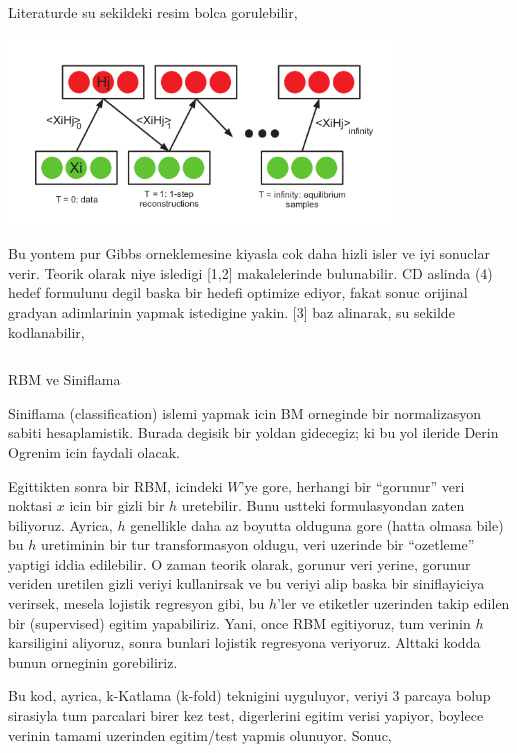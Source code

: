 \documentclass[12pt,fleqn]{article}\usepackage{../common}
\begin{document}
Literaturde su sekildeki resim bolca gorulebilir,

\includegraphics[height=5cm]{rbm_03.png}

Bu yontem pur Gibbs orneklemesine kiyasla cok daha hizli isler ve iyi
sonuclar verir. Teorik olarak niye isledigi [1,2] makalelerinde
bulunabilir. CD aslinda (4) hedef formulunu degil baska bir hedefi optimize
ediyor, fakat sonuc orijinal gradyan adimlarinin yapmak istedigine
yakin. [3] baz alinarak, su sekilde kodlanabilir,

\inputminted[fontsize=\footnotesize]{python}{rbm.py}

RBM ve Siniflama 

Siniflama (classification) islemi yapmak icin BM orneginde bir
normalizasyon sabiti hesaplamistik. Burada degisik bir yoldan gidecegiz; ki
bu yol ileride Derin Ogrenim icin faydali olacak. 

Egittikten sonra bir RBM, icindeki $W$'ye gore, herhangi bir ``gorunur''
veri noktasi $x$ icin bir gizli bir $h$ uretebilir. Bunu ustteki
formulasyondan zaten biliyoruz. Ayrica, $h$ genellikle daha az boyutta
olduguna gore (hatta olmasa bile) bu $h$ uretiminin bir tur transformasyon
oldugu, veri uzerinde bir ``ozetleme'' yaptigi iddia edilebilir. O zaman
teorik olarak, gorunur veri yerine, gorunur veriden uretilen gizli veriyi
kullanirsak ve bu veriyi alip baska bir siniflayiciya verirsek, mesela
lojistik regresyon gibi, bu $h$'ler ve etiketler uzerinden takip edilen bir
(supervised) egitim yapabiliriz. Yani, once RBM egitiyoruz, tum verinin $h$
karsiligini aliyoruz, sonra bunlari lojistik regresyona veriyoruz. Alttaki
kodda bunun orneginin gorebiliriz.

Bu kod, ayrica, k-Katlama (k-fold) teknigini uyguluyor, veriyi 3 parcaya
bolup sirasiyla tum parcalari birer kez test, digerlerini egitim verisi
yapiyor, boylece verinin tamami uzerinden egitim/test yapmis
olunuyor. Sonuc,

\inputminted[fontsize=\footnotesize]{python}{test_rbmkfold.py}
\end{document}
